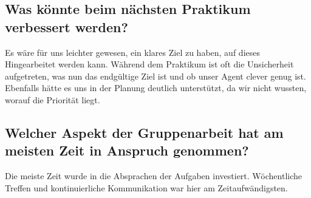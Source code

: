 \subsection{Was könnte beim nächsten Praktikum verbessert werden?}
Es wäre für uns leichter gewesen, ein klares Ziel zu haben, auf dieses Hingearbeitet werden kann. Während dem Praktikum ist oft die Unsicherheit aufgetreten, was nun das endgültige Ziel ist und ob unser Agent clever genug ist. Ebenfalls hätte es uns in der Planung deutlich unterstützt, da wir nicht wussten, worauf die Priorität liegt.

\subsection{Welcher Aspekt der Gruppenarbeit hat am meisten Zeit in Anspruch genommen?}
Die meiste Zeit wurde in die Absprachen der Aufgaben investiert. Wöchentliche Treffen und kontinuierliche Kommunikation war hier am Zeitaufwändigsten.
